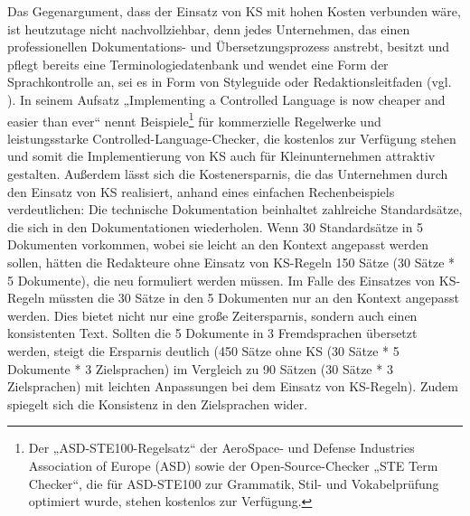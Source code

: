 Das Gegenargument, dass der Einsatz von KS mit hohen Kosten verbunden wäre, ist heutzutage nicht nachvollziehbar, denn jedes Unternehmen, das einen professionellen Dokumentations- und Übersetzungsprozess anstrebt, besitzt und pflegt bereits eine Terminologiedatenbank und wendet eine Form der Sprachkontrolle an, sei es in Form von Styleguide oder Redaktionsleitfaden (vgl. \citealt{Göpferich2007a}). In seinem Aufsatz „Implementing a Controlled Language is now cheaper and easier than ever“ nennt \citet{Mügge2013} Beispiele\footnote{{{{Der „ASD-STE100-Regelsatz“ der AeroSpace- und Defense Industries Association of Europe (ASD) sowie der Open-Source-Checker „STE Term Checker“, die für ASD-STE100 zur Grammatik, Stil- und Vokabelprüfung optimiert wurde, stehen kostenlos zur Verfügung.}}}} für kommerzielle Regelwerke und leistungsstarke Controlled-Language-Checker, die kostenlos zur Verfügung stehen und somit die Implementierung von KS auch für Kleinunternehmen attraktiv gestalten. Außerdem lässt sich die Kostenersparnis, die das Unternehmen durch den Einsatz von KS realisiert, anhand eines einfachen Rechenbeispiels verdeutlichen: Die technische Dokumentation beinhaltet zahlreiche Standardsätze, die sich in den Dokumentationen wiederholen. Wenn 30 Standardsätze in 5 Dokumenten vorkommen, wobei sie leicht an den Kontext angepasst werden sollen, hätten die Redakteure ohne Einsatz von KS-Regeln 150 Sätze (30 Sätze * 5 Dokumente), die neu formuliert werden müssen. Im Falle des Einsatzes von KS-Regeln müssten die 30 Sätze in den 5 Dokumenten nur an den Kontext angepasst werden. Dies bietet nicht nur eine große Zeitersparnis, sondern auch einen konsistenten Text. Sollten die 5 Dokumente in 3 Fremdsprachen übersetzt werden, steigt die Ersparnis deutlich (450 Sätze ohne KS (30 Sätze * 5 Dokumente * 3 Zielsprachen) im Vergleich zu 90 Sätzen (30 Sätze * 3 Zielsprachen) mit leichten Anpassungen bei dem Einsatz von KS-Regeln). Zudem spiegelt sich die Konsistenz in den Zielsprachen wider.

